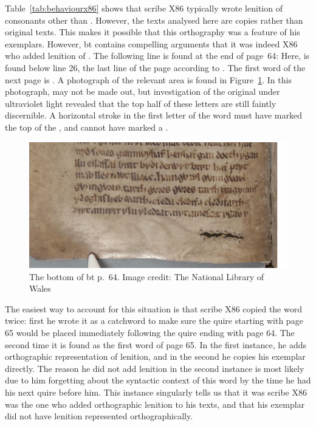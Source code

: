 Table~\ref{tab:behaviourx86} shows that scribe X86 typically wrote lenition of consonants other than . However, the texts analysed here are copies rather than original texts. This makes it possible that this orthography was a feature of his exemplars. However, \acrshort{bt} contains compelling arguments that it was indeed X86 who added lenition of . The following line is found at the end of page~64:
Here,  is found below line 26, the last line of the page according to \textcite{evans_facsimile_1915}. The first word of the next page is . A photograph of the relevant area is found in Figure~\ref{fig:p64}. In this photograph,  may not be made out, but investigation of the original under ultraviolet light revealed that the top half of these letters are still faintly discernible. A horizontal stroke in the first letter of the word must have marked the top of the , and cannot have marked a .  

\begin{figure}[h]
    \centering
    \includegraphics[width=\textwidth]{3orth/images/canvas.png}
    \caption[The bottom of \acrshort{bt} p.~64]{The bottom of \gls{bt} p.~64. Image credit: The National Library of Wales}
    \label{fig:p64}
\end{figure}

The easiest way to account for this situation is that scribe X86  copied the word  twice: first he wrote it as a catchword to make sure the quire starting with page 65 would be placed immediately following the quire ending with page 64. The second time it is found as the first word of page 65. In the first instance, he adds orthographic representation of lenition, and in the second he copies his exemplar directly. The reason he did not add lenition in the second instance is most likely due to him forgetting about the syntactic context of this word by the time he had his next quire before him. This instance singularly tells us that it was scribe X86 was the one who added orthographic lenition to his texts, and that his exemplar did not have lenition represented orthographically.



